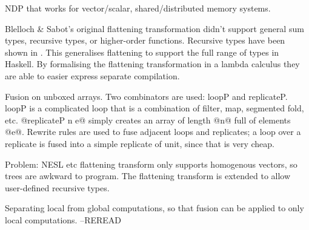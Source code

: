 NDP that works for vector/scalar, shared/distributed memory systems.

Blelloch & Sabot's original flattening transformation didn't support general sum types, recursive types, or higher-order functions. Recursive types have been shown in \cite{keller1998flattening}.
This generalises flattening to support the full range of types in Haskell.
By formalising the flattening transformation in a lambda calculus they are able to easier express separate compilation.

Fusion on unboxed arrays. Two combinators are used: loopP and replicateP.
loopP is a complicated loop that is a combination of filter, map, segmented fold, etc.
@replicateP n e@ simply creates an array of length @n@ full of elements @e@.
Rewrite rules are used to fuse adjacent loops and replicates; a loop over a replicate is
fused into a simple replicate of unit, since that is very cheap.




Problem: NESL etc flattening transform only supports homogenous vectors, so trees are awkward to program.
The flattening transform is extended to allow user-defined recursive types.

Separating local from global computations, so that fusion can be applied to only local computations.
--REREAD





